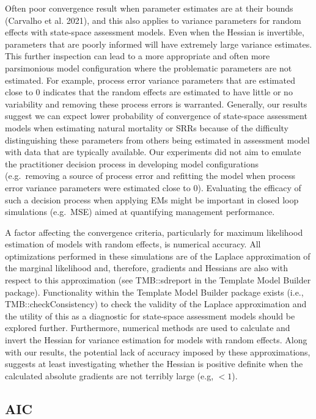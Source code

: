 \documentclass[
  12pt,
]{article}
\begin{document}
Often poor convergence result when parameter estimates are at their
bounds (Carvalho et al. 2021), and this also applies to variance
parameters for random effects with state-space assessment models. Even
when the Hessian is invertible, parameters that are poorly informed will
have extremely large variance estimates. This further inspection can
lead to a more appropriate and often more parsimonious model
configuration where the problematic parameters are not estimated. For
example, process error variance parameters that are estimated close to 0
indicates that the random effects are estimated to have little or no
variability and removing these process errors is warranted. Generally,
our results suggest we can expect lower probability of convergence of
state-space assessment models when estimating natural mortality or SRRs
because of the difficulty distinguishing these parameters from others
being estimated in assessment model with data that are typically
available. Our experiments did not aim to emulate the practitioner
decision process in developing model configurations (e.g.~removing a
source of process error and refitting the model when process error
variance parameters were estimated close to 0). Evaluating the efficacy
of such a decision process when applying EMs might be important in
closed loop simulations (e.g.~MSE) aimed at quantifying management
performance.

A factor affecting the convergence criteria, particularly for maximum
likelihood estimation of models with random effects, is numerical
accuracy. All optimizations performed in these simulations are of the
Laplace approximation of the marginal likelihood and, therefore,
gradients and Hessians are also with respect to this approximation (see
TMB::sdreport in the Template Model Builder package). Functionality
within the Template Model Builder package exists (i.e.,
TMB::checkConsistency) to check the validity of the Laplace
approximation and the utility of this as a diagnostic for state-space
assessment models should be explored further. Furthermore, numerical
methods are used to calculate and invert the Hessian for variance
estimation for models with random effects. Along with our results, the
potential lack of accuracy imposed by these approximations, suggests at
least investigating whether the Hessian is positive definite when the
calculated absolute gradients are not terribly large (e.g, \(< 1\)).

\subsection*{AIC}\label{aic}
\end{document}
